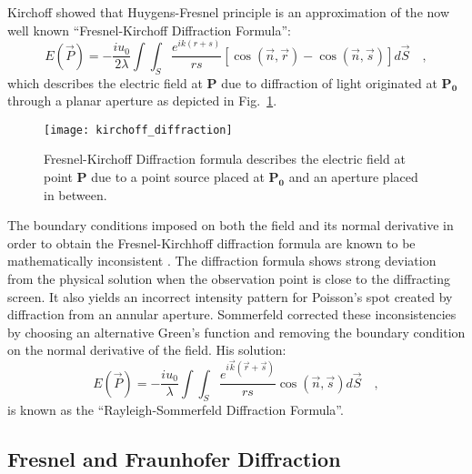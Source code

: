 Kirchoff \cite{kirchoff1883} showed that Huygens-Fresnel principle is an approximation of the now well known ``Fresnel-Kirchoff Diffraction Formula'':
\begin{equation}
\label{eq:fresnel_kirchoff}
E(\vec{P}) = -\frac{iu_0}{2\lambda}\int \int _S \frac{e^{ik(r+s)}}{rs}\left[\cos (\vec{n},\vec{r}) - \cos (\vec{n},\vec{s})\right]d\vec{S} \quad ,
\end{equation}
which describes the electric field at \textbf{P} due to diffraction of light originated at $\mathbf{P_0}$ through a planar aperture as depicted in Fig.~\ref{fig:kirchoff_diffraction}.
\begin{figure}[t!]
  \centering
  \texttt{[image: kirchoff\_diffraction]}
  \caption{Fresnel-Kirchoff Diffraction formula describes the electric field at point $\mathbf{P}$ due to a point source placed at $\mathbf{P_0}$ and an aperture placed in between.}
  \label{fig:kirchoff_diffraction}
\end{figure}
The boundary conditions imposed on both the field and its normal derivative in order to obtain the Fresnel-Kirchhoff diffraction formula are known to be mathematically inconsistent \cite{Lucke_2006, Heurtley:73, Sommerfeld:1954:O}.  The diffraction formula shows strong deviation from the physical solution when the observation point is close to the diffracting screen. It also yields an incorrect intensity pattern for Poisson's spot created by diffraction from an annular aperture. Sommerfeld corrected these inconsistencies by choosing an alternative Green's function and removing the boundary condition on the normal derivative of the field. His solution:
\begin{equation}
\label{eq:rayleigh_sommerfeld}
E(\vec{P}) = -\frac{iu_0}{\lambda}\int \int _S \frac{e^{i\vec{k}(\vec{r}+\vec{s})}}{rs} \cos (\vec{n},\vec{s}) d\vec{S} \quad ,
\end{equation}
is known as the ``Rayleigh-Sommerfeld Diffraction Formula''.

\subsection{Fresnel and Fraunhofer Diffraction}

